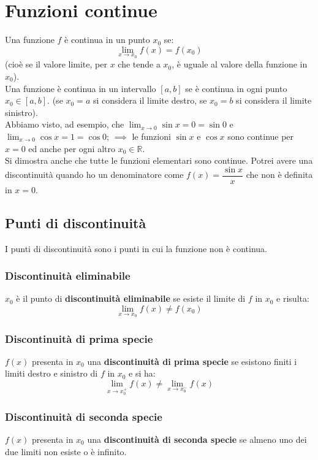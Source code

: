 \documentclass[../../main.tex]{subfiles}
\begin{document}
\section{Funzioni continue}
Una funzione $f$ è continua in un punto $x_0$ se:
\[
    \lim_{x\to x_0} f(x) = f(x_0)
\]
(cioè se il valore limite, per $x$ che tende a $x_0$, è uguale al valore della funzione in $x_0$).\\
Una funzione è continua in un intervallo $[a, b]$ se è continua in ogni punto $x_0 \in [a, b]$.
(se $x_0 = a$ si considera il limite destro, se $x_0 = b$ si considera il limite sinistro).\\
Abbiamo visto, ad esempio, che $\lim_{x\to 0} \sin x = 0 = \sin 0$ e $\lim_{x\to 0} \cos x = 1 = \cos 0$;
$\implies$ le funzioni $\sin x$ e $\cos x$ sono continue per $x=0$ ed anche per ogni altro $x_0 \in \mathbb{R}$.\\
Si dimostra anche che tutte le funzioni elementari sono continue. Potrei avere una discontinuità quando ho un denominatore come $f(x) = \dfrac{\sin x}{x}$
che non è definita in $x=0$.

\subsection{Punti di discontinuità}
I punti di discontinuità sono i punti in cui la funzione non è continua.
\subsubsection{Discontinuità eliminabile}
$x_0$ è il punto di \textbf{discontinuità eliminabile} se esiste il limite di $f$ in $x_0$ e risulta:
\[
    \lim_{x\to x_0} f(x) \neq f(x_0)
\]

\subsubsection{Discontinuità di prima specie}
$f(x)$ presenta in $x_0$ una \textbf{discontinuità di prima specie} se esistono finiti i limiti destro e sinistro di $f$ in $x_0$ e si ha:
\[
    \lim_{x\to x_0^+} f(x) \neq \lim_{x\to x_0^-} f(x)
\]

\subsubsection{Discontinuità di seconda specie}
$f(x)$ presenta in $x_0$ una \textbf{discontinuità di seconda specie} se almeno uno dei due limiti non esiste o è infinito.
\end{document}
